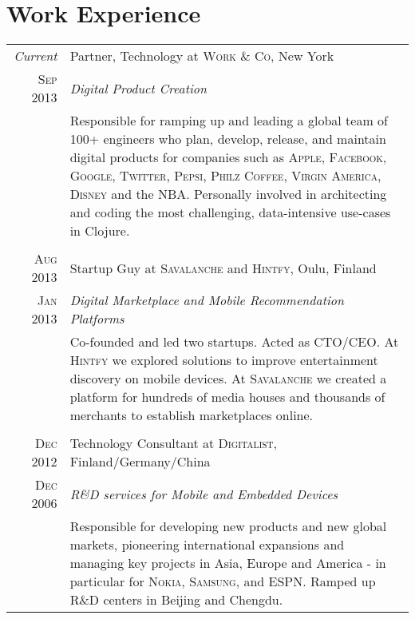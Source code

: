 \documentclass[a4paper,10pt]{article}
\begin{document}
\section{Work Experience}
\begin{tabular}{r|p{11cm}}
  \emph{Current} & Partner, Technology at \textsc{Work \& Co}, New York \\

  \textsc{Sep 2013} & \emph{Digital Product Creation}\\

  &\footnotesize{Responsible for ramping up and leading a global team of 100+
    engineers who plan, develop, release, and maintain digital products for
    companies such as \textsc{Apple}, \textsc{Facebook}, \textsc{Google},
    \textsc{Twitter}, \textsc{Pepsi}, \textsc{Philz Coffee}, \textsc{Virgin
      America}, \textsc{Disney} and the \textsc{NBA}. Personally involved in
    architecting and coding the most challenging, data-intensive use-cases in
    Clojure.}\\

  \multicolumn{2}{c}{}\\

  \textsc{Aug 2013} & Startup Guy at \textsc{Savalanche} and \textsc{Hintfy}, Oulu, Finland \\

  \textsc{Jan 2013} & \emph{Digital Marketplace and Mobile Recommendation Platforms} \\

  &\footnotesize{Co-founded and led two startups. Acted as \textsc{CTO/CEO}. At
    \textsc{Hintfy} we explored solutions to improve entertainment discovery on
    mobile devices. At \textsc{Savalanche} we created a platform for hundreds of
    media houses and thousands of merchants to establish marketplaces online.}\\

  \multicolumn{2}{c}{}\\

  \textsc{Dec 2012} & Technology Consultant at \textsc{Digitalist},
  Finland/Germany/China \\

  \textsc{Dec 2006} & \emph{R\&D services for Mobile and Embedded Devices} \\

  &\footnotesize{Responsible for developing new products and new global markets,
    pioneering international expansions and managing key projects in Asia,
    Europe and America - in particular for \textsc{Nokia}, \textsc{Samsung}, and
    \textsc{ESPN}. Ramped up R\&D centers in Beijing and Chengdu.}\\


\end{tabular}
\end{document}
